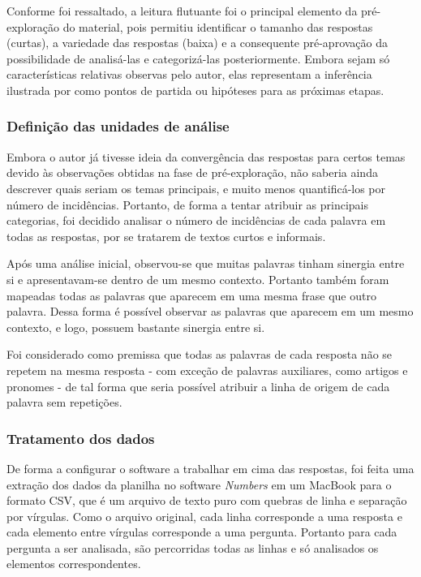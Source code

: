 Conforme foi ressaltado, a leitura flutuante foi o principal elemento da pré-exploração do material, pois permitiu identificar o tamanho das respostas (curtas), a variedade das respostas (baixa) e a consequente pré-aprovação da possibilidade de analisá-las e categorizá-las posteriormente. Embora sejam só características relativas observas pelo autor, elas representam a inferência ilustrada por  como pontos de partida ou hipóteses para as próximas etapas.

\subsubsection*{Definição das unidades de análise}

Embora o autor já tivesse ideia da convergência das respostas para certos temas devido às observações obtidas na fase de pré-exploração, não saberia ainda descrever quais seriam os temas principais, e muito menos quantificá-los por número de incidências. Portanto, de forma a tentar atribuir as principais categorias, foi decidido analisar o número de incidências de cada palavra em todas as respostas, por se tratarem de textos curtos e informais.

Após uma análise inicial, observou-se que muitas palavras tinham sinergia entre si e apresentavam-se dentro de um mesmo contexto. Portanto também foram mapeadas todas as palavras que aparecem em uma mesma frase que outro palavra. Dessa forma é possível observar as palavras que aparecem em um mesmo contexto, e logo, possuem bastante sinergia entre si.

Foi considerado como premissa que todas as palavras de cada resposta não se repetem na mesma resposta - com exceção de palavras auxiliares, como artigos e pronomes - de tal forma que seria possível atribuir a linha de origem de cada palavra sem repetições.

\subsubsection*{Tratamento dos dados}

De forma a configurar o software a trabalhar em cima das respostas, foi feita uma extração dos dados da planilha no software \textit{Numbers} em um MacBook para o formato CSV, que é um arquivo de texto puro com quebras de linha e separação por vírgulas. Como o arquivo original, cada linha corresponde a uma resposta e cada elemento entre vírgulas corresponde a uma pergunta. Portanto para cada pergunta a ser analisada, são percorridas todas as linhas e só analisados os elementos correspondentes.


